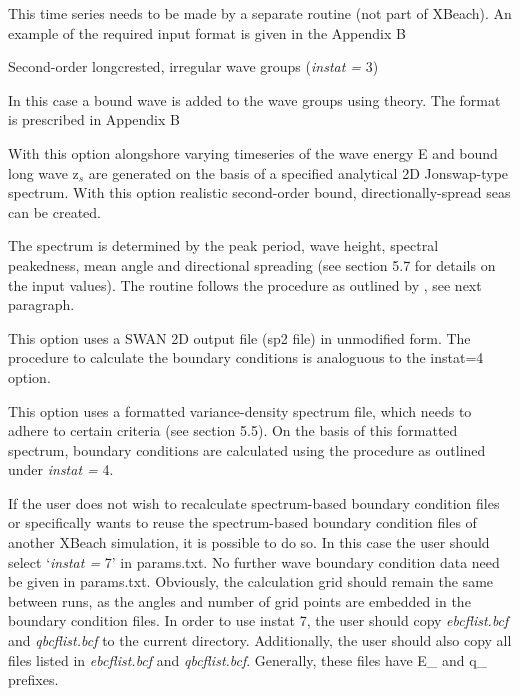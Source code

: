 This time series needs to be made by a separate routine (not part of XBeach). An example of the required input format is given in the Appendix B

Second-order longcrested, irregular wave groups (\textit{instat =} 3)

In this case a bound wave is added to the wave groups using \citet{LonguetHigginsStewart1964} theory. The format is prescribed in Appendix B

 \textit{}

With this option alongshore varying timeseries of the wave energy E and bound long wave z${}_{s}$ are generated on the basis of a specified analytical 2D Jonswap-type spectrum. With this option realistic second-order bound, directionally-spread seas can be created. 

The spectrum is determined by the peak period, wave height, spectral peakedness, mean angle and directional spreading (see section 5.7 for details on the input values). The routine follows the procedure as outlined by \citet{VanDongeren2003}, see next paragraph.

\textit{}

\underbar{}

This option uses a SWAN 2D output file (sp2 file) in unmodified form. The procedure to calculate the boundary conditions is analoguous to the instat=4 option.

\textit{}

\underbar{}

This option uses a formatted variance-density spectrum file, which needs to adhere to certain criteria (see section 5.5). On the basis of this formatted spectrum, boundary conditions are calculated using the procedure as outlined under \textit{instat =} 4.

\textit{}

\underbar{}

If the user does not wish to recalculate spectrum-based boundary condition files or specifically wants to reuse the spectrum-based boundary condition files of another XBeach simulation, it is possible to do so. In this case the user should select `\textit{instat =} 7' in params.txt. No further wave boundary condition data need be given in params.txt. Obviously, the calculation grid should remain the same between runs, as the angles and number of grid points are embedded in the boundary condition files. In order to use instat 7, the user should copy \textit{ebcflist.bcf} and \textit{qbcflist.bcf} to the current directory. Additionally, the user should also copy all files listed in \textit{ebcflist.bcf} and \textit{qbcflist.bcf}. Generally, these files have E\_ and q\_ prefixes.

